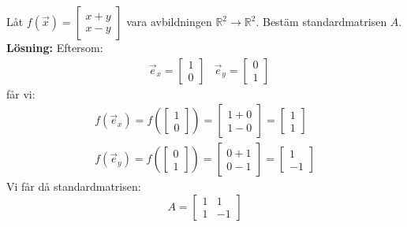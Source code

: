 \begin{Ex}
    Låt $f(\vec{x}) = \begin{bmatrix} x+y\\x-y \end{bmatrix}$ vara avbildningen $\mathbb{R}^2\rightarrow \mathbb{R}^2$. Bestäm standardmatrisen $A$.\\
    \textbf{Lösning:} Eftersom:
    \begin{align*}
    &\vec{e}_x = \begin{bmatrix} 1\\0 \end{bmatrix} &\vec{e}_y = \begin{bmatrix} 0\\1 \end{bmatrix}
    \end{align*}
    får vi:
    \begin{gather}
    	f(\vec{e}_x) = f(\begin{bmatrix} 1\\0 \end{bmatrix}) = \begin{bmatrix} 1+0\\1-0 \end{bmatrix} = \begin{bmatrix} 1\\1 \end{bmatrix} \\
    	f(\vec{e}_y) = f(\begin{bmatrix} 0\\1 \end{bmatrix}) = \begin{bmatrix} 0+1\\0-1 \end{bmatrix} = \begin{bmatrix} 1\\-1 \end{bmatrix}
    \end{gather}
    Vi får då standardmatrisen:
    \[
        A = \begin{bmatrix} 1&1\\1&-1 \end{bmatrix}
    \]
\end{Ex}

